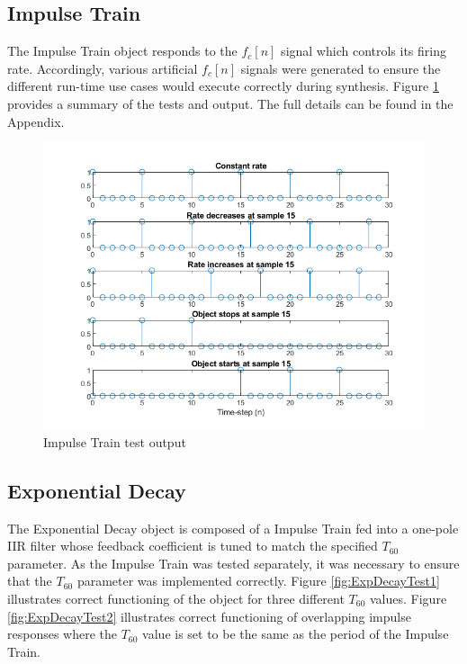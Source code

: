 \documentclass[../main.tex]{subfiles}
\begin{document}
\subsection{Impulse Train}
The Impulse Train object responds to the $f_c[n]$ signal which controls its firing rate. Accordingly, various artificial $f_c[n]$ signals were generated to ensure the different run-time use cases would execute correctly during synthesis. Figure \ref{fig:ImpulseTrainTest} provides a summary of the tests and output. The full details can be found in the Appendix. 

\begin{figure}[h]
    \centering
    \includegraphics[scale=.65]{./images/plots/ImpulseTrainTest.png}
    \caption{Impulse Train test output}
    \label{fig:ImpulseTrainTest}
\end{figure}

\subsection{Exponential Decay}
The Exponential Decay object is composed of a Impulse Train fed into a one-pole IIR filter whose feedback coefficient is tuned to match the specified $T_{60}$ parameter. As the Impulse Train was tested separately, it was necessary to ensure that the $T_{60}$ parameter was implemented correctly. Figure \ref{fig:ExpDecayTest1} illustrates correct functioning of the object for three different $T_{60}$ values. Figure \ref{fig:ExpDecayTest2} illustrates correct functioning of overlapping impulse responses where the $T_{60}$ value is set to be the same as the period of the Impulse Train.
\end{document}
